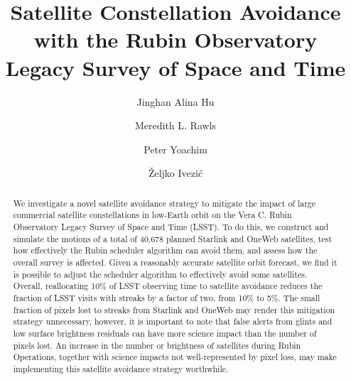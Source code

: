 \documentclass[twocolumn]{aastex631}
\begin{document}
\title{Satellite Constellation Avoidance with the Rubin Observatory Legacy Survey of Space and Time}

\author[0000-0002-8400-1910]{Jinghan Alina Hu}
\author[0000-0003-1305-7308]{Meredith L. Rawls}
\author[0000-0003-2874-6464]{Peter Yoachim}
\author[0000-0001-5250-2633]{\v{Z}eljko Ivezi\'{c}}


\begin{abstract}
We investigate a novel satellite avoidance strategy to mitigate the impact of large commercial satellite constellations in low-Earth orbit on the Vera C. Rubin Observatory Legacy Survey of Space and Time (LSST). To do this, we construct and simulate the motions of a total of 40,678 planned Starlink and OneWeb satellites, test how effectively the Rubin scheduler algorithm can avoid them, and assess how the overall survey is affected.
Given a reasonably accurate satellite orbit forecast, we find it is possible to adjust the scheduler algorithm to effectively avoid some satellites. Overall, reallocating 10\% of LSST observing time to satellite avoidance reduces the fraction of LSST visits with streaks by a factor of two, from 10\% to 5\%. The small fraction of pixels lost to streaks from Starlink and OneWeb may render this mitigation strategy unnecessary, however, it is important to note that false alerts from glints and low surface brightness residuals can have more science impact than the number of pixels lost.
An increase in the number or brightness of satellites during Rubin Operations, together with science impacts not well-represented by pixel loss, may make implementing this satellite avoidance strategy worthwhile.
\end{abstract}


\end{document}
